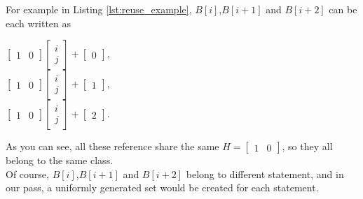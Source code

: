 \documentclass[paper=a4, fontsize=11pt]{scrartcl}
\numberwithin{equation}{section}        %
\numberwithin{figure}{section}          %
\numberwithin{table}{section}               %
\begin{document}
            For example in Listing \ref{lst:reuse_example}, $B[i]$,$B[i+1]$ and $B[i+2]$ can be each written as
            \begin{center}
                $
                \begin{bmatrix}
                    1 & 0
                \end{bmatrix}
                \begin{bmatrix}
                    i\\
                    j
                \end{bmatrix}
                +
                \begin{bmatrix}
                    0
                \end{bmatrix}
                $,\\
                $
                \begin{bmatrix}
                    1 & 0
                \end{bmatrix}
                \begin{bmatrix}
                    i\\
                    j
                \end{bmatrix}
                +
                \begin{bmatrix}
                    1
                \end{bmatrix}
                $,\\
                $
                \begin{bmatrix}
                    1 & 0
                \end{bmatrix}
                \begin{bmatrix}
                    i\\
                    j
                \end{bmatrix}
                +
                \begin{bmatrix}
                    2
                \end{bmatrix}
                $.
            \end{center}
            As you can see, all these reference share the same $H=\begin{bmatrix}1 & 0\end{bmatrix}$,
            so they all belong to the same class.\\
            Of course, $B[i]$,$B[i+1]$ and $B[i+2]$ belong to different statement, and in
            our pass, a uniformly generated set would be created for each statement.
\end{document}
